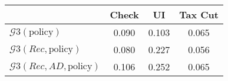 \begin{tabular}{@{}lccc@{}} 
\toprule 
                          & Check      & UI    & Tax Cut    \\  \midrule 
$\mathcal{G}3(\text{policy})$ & 0.090  & 0.103  & 0.065     \\ 
$\mathcal{G}3(Rec,\text{policy})$ & 0.080  & 0.227  & 0.056     \\ 
$\mathcal{G}3(Rec, AD,\text{policy})$ & 0.106  & 0.252  & 0.065     \\ 
\end{tabular}  
